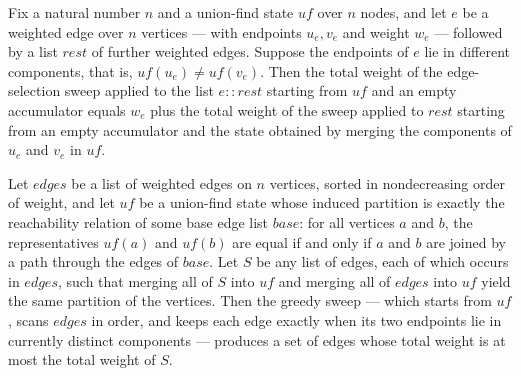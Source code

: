 \begin{lemma}
\label{Kruskal.processEdges_take_weight}
\leanok
{}
Fix a natural number $n$ and a union-find state $\mathit{uf}$ over $n$ nodes, and let
$e$ be a weighted edge over $n$ vertices — with endpoints $u_e, v_e$ and weight $w_e$ —
followed by a list $\mathit{rest}$ of further weighted edges. Suppose the endpoints of
$e$ lie in different components, that is, $\mathit{uf}(u_e) \ne \mathit{uf}(v_e)$. Then
the total weight of the edge-selection sweep applied to the list $e :: \mathit{rest}$
starting from $\mathit{uf}$ and an empty accumulator equals $w_e$ plus the total weight
of the sweep applied to $\mathit{rest}$ starting from an empty accumulator and the state
obtained by merging the components of $u_e$ and $v_e$ in $\mathit{uf}$.
\end{lemma}

\begin{lemma}
\label{Kruskal.processEdges_optimal}
\leanok
{}
Let $\mathit{edges}$ be a list of weighted edges on $n$ vertices, sorted in
nondecreasing order of weight, and let $\mathit{uf}$ be a union-find state whose induced
partition is exactly the reachability relation of some base edge list $\mathit{base}$:
for all vertices $a$ and $b$, the representatives $\mathit{uf}(a)$ and $\mathit{uf}(b)$
are equal if and only if $a$ and $b$ are joined by a path through the edges of
$\mathit{base}$. Let $S$ be any list of edges, each of which occurs in $\mathit{edges}$,
such that merging all of $S$ into $\mathit{uf}$ and merging all of $\mathit{edges}$ into
$\mathit{uf}$ yield the same partition of the vertices. Then the greedy sweep — which
starts from $\mathit{uf}$, scans $\mathit{edges}$ in order, and keeps each edge exactly
when its two endpoints lie in currently distinct components — produces a set of edges
whose total weight is at most the total weight of $S$.
\end{lemma}

